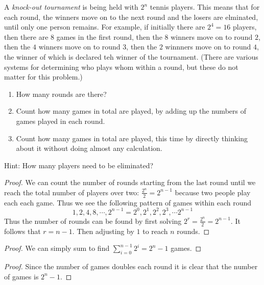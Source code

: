 \begin{tcolorbox}[title=Problem 5, breakable]
    A \emph{knock-out tournament} is being held with $2^n$ tennis players.
    This means that for each round, the winners move on to the next round 
    and the losers are elminated, until only one person remains.
    For example, if initially there are $2^4 = 16$ players, then there 
    are $8$ games in the first round, then the $8$ winners move on to round $2$,
    then the $4$ winners move on to round $3$, then the $2$ winnners move on to round $4$,
    the winner of which is declared teh winner of the tournament. (There are various systems 
    for determining who plays whom within a round, but these do not matter for this problem.)
    \begin{enumerate}
        \item How many rounds are there?
        \item Count how many games in total are played, by adding up the numbers of games 
              played in each round.
        \item Count how many games in total are played, this time by directly thinking about it without 
              doing almost any calculation.
    \end{enumerate}
    Hint: How many players need to be eliminated?
\end{tcolorbox}

\begin{proof}
    We can count the number of rounds starting from the last round until we reach the total number of players over two: 
        $\frac{2^n}{2} = 2^{n - 1}$
        because two people play each each game.
    Thus we see the following pattern of games within each round 
    \[1, 2, 4, 8, \cdots, 2^{n - 1} = 2^0, 2^1, 2^2, 2^3, \cdots 2^{n - 1}\]
    Thus the number of rounds can be found by first solving $2^r =\frac{2^n}{2} = 2^{n - 1}$.
    It follows that $r = n - 1$. Then adjusting by $1$ to reach $n$ rounds.
\end{proof}

\begin{proof}
    We can simply sum to find $\sum_{i = 0}^{n - 1} 2^i = 2^n - 1$ games.
\end{proof}

\begin{proof}
    Since the number of games doubles each round it is clear that
        the number of games is $2^n - 1$.
\end{proof}

